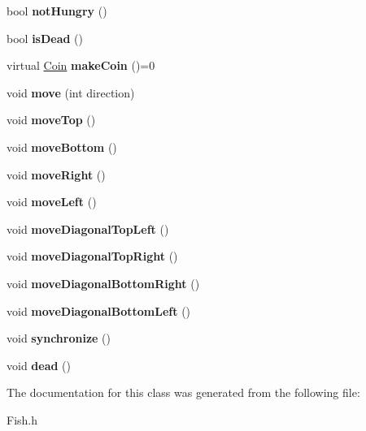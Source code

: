 \begin{DoxyCompactItemize}
bool {\bfseries not\+Hungry} ()
\item 
\mbox{\label{class_fish_aa93ccf117491c6778c0ab3eb5b454997}} 
bool {\bfseries is\+Dead} ()
\item 
\mbox{\label{class_fish_a54eadea82441af699651d73b877ba178}} 
virtual \mbox{\hyperlink{class_coin}{Coin}} {\bfseries make\+Coin} ()=0
\item 
\mbox{\label{class_fish_a25946c0d81cd0edd1e22762f7b34e16b}} 
void {\bfseries move} (int direction)
\item 
\mbox{\label{class_fish_a578f11894521e56ddbd62c30ef1dfe8d}} 
void {\bfseries move\+Top} ()
\item 
\mbox{\label{class_fish_ac2cceb1e9b353522909d81d7071a9595}} 
void {\bfseries move\+Bottom} ()
\item 
\mbox{\label{class_fish_ab8a55c0af173c7af006952fa47b08b7a}} 
void {\bfseries move\+Right} ()
\item 
\mbox{\label{class_fish_a440c300548c92ffdd4582c62beccc95e}} 
void {\bfseries move\+Left} ()
\item 
\mbox{\label{class_fish_af895191e0ccaf45fca80f62913db642d}} 
void {\bfseries move\+Diagonal\+Top\+Left} ()
\item 
\mbox{\label{class_fish_ae76c1f17dbf67a93d1f7ab461a11171f}} 
void {\bfseries move\+Diagonal\+Top\+Right} ()
\item 
\mbox{\label{class_fish_a7b9ea9778f079638e0e1b1bd5263aa5d}} 
void {\bfseries move\+Diagonal\+Bottom\+Right} ()
\item 
\mbox{\label{class_fish_a26f6c324a4081bcfd9fbb8770031b13c}} 
void {\bfseries move\+Diagonal\+Bottom\+Left} ()
\item 
\mbox{\label{class_fish_a7473acf2b44fc41c1741a98a9a1c4038}} 
void {\bfseries synchronize} ()
\item 
\mbox{\label{class_fish_a972444e9ae06cf53ea0823447eb79508}} 
void {\bfseries dead} ()
\end{DoxyCompactItemize}


The documentation for this class was generated from the following file\+:\begin{DoxyCompactItemize}
\item 
Fish.\+h\end{DoxyCompactItemize}
